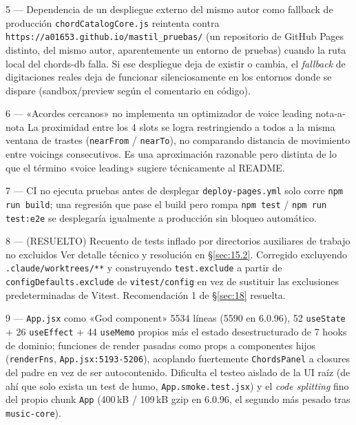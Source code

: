 \documentclass[a4paper,11pt,oneside]{report}
\newcommand{\Sref}[1]{\S\ref{#1}}
\begin{document}
\begin{hallazgobox}{5 --- Dependencia de un despliegue externo del mismo autor como fallback de producción}
\lstinline!chordCatalogCore.js! reintenta contra \lstinline!https://a01653.github.io/mastil_pruebas/! (un repositorio de GitHub Pages distinto, del mismo autor, aparentemente un entorno de pruebas) cuando la ruta local del chords-db falla. Si ese despliegue deja de existir o cambia, el \textit{fallback} de digitaciones reales deja de funcionar silenciosamente en los entornos donde se dispare (sandbox/preview según el comentario en código).
\end{hallazgobox}

\begin{hallazgobox}{6 --- «Acordes cercanos» no implementa un optimizador de voice leading nota-a-nota}
La proximidad entre los 4 slots se logra restringiendo a todos a la misma ventana de trastes (\lstinline!nearFrom! / \lstinline!nearTo!), no comparando distancia de movimiento entre voicings consecutivos. Es una aproximación razonable pero distinta de lo que el término «voice leading» sugiere técnicamente al README.
\end{hallazgobox}

\begin{hallazgobox}{7 --- CI no ejecuta pruebas antes de desplegar}
\lstinline!deploy-pages.yml! solo corre \lstinline!npm run build!; una regresión que pase el build pero rompa \lstinline!npm test! / \lstinline!npm run test:e2e! se desplegaría igualmente a producción sin bloqueo automático.
\end{hallazgobox}

\begin{hallazgobox}{8 --- (RESUELTO) Recuento de tests inflado por directorios auxiliares de trabajo no excluidos}
Ver detalle técnico y resolución en \Sref{sec:15.2}. Corregido excluyendo \lstinline!.claude/worktrees/**! y construyendo \lstinline!test.exclude! a partir de \lstinline!configDefaults.exclude! de \lstinline!vitest/config! en vez de sustituir las exclusiones predeterminadas de Vitest. Recomendación 1 de \Sref{sec:18} resuelta.
\end{hallazgobox}

\begin{hallazgobox}{9 --- \texttt{App.jsx} como «God component»}
5534 líneas (5590 en 6.0.96), 52 \lstinline!useState! + 26 \lstinline!useEffect! + 44 \lstinline!useMemo! propios más el estado desestructurado de 7 hooks de dominio; funciones de render pasadas como props a componentes hijos (\lstinline!renderFns!, \lstinline!App.jsx:5193-5206!), acoplando fuertemente \lstinline!ChordsPanel! a closures del padre en vez de ser autocontenido. Dificulta el testeo aislado de la UI raíz (de ahí que solo exista un test de humo, \lstinline!App.smoke.test.jsx!) y el \textit{code splitting} fino del propio chunk \lstinline!App! (400\,kB / 109\,kB gzip en 6.0.96, el segundo más pesado tras \lstinline!music-core!).
\end{hallazgobox}
\end{document}
